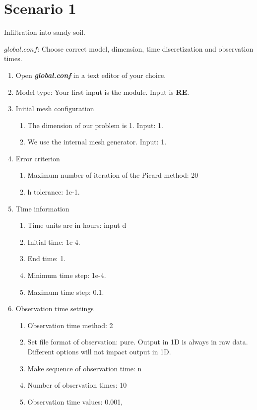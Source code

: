 \documentclass[
10pt, %
a4paper, %
oneside, %
headinclude,footinclude, %
BCOR5mm, %
]{scrartcl}
\begin{document}
\section*{Scenario 1}

Infiltration into sandy soil. 

$global.conf$: Choose correct model, dimension, time discretization and observation times.
\begin{enumerate}
\item Open \textbf{\emph{global.conf}} in a text editor of your choice. 
\item Model type: Your first input is the module. Input is \textbf{RE}.
\item Initial mesh configuration \begin{enumerate}
\item The dimension of our problem is 1. Input: 1.
\item We use the internal mesh generator. Input: 1. 
\end{enumerate}
\item Error criterion \begin{enumerate} 
\item Maximum number of iteration of the Picard method: 20 
\item h tolerance: 1e-1.
\end{enumerate}
\item Time information 
\begin{enumerate} 
\item Time units are in hours: input d
\item Initial time: 1e-4.
\item End time: 1.
\item Minimum time step: 1e-4.
\item Maximum time step: 0.1.
\end{enumerate}
\item Observation time settings \begin{enumerate}
\item Observation time method: 2
\item Set file format of observation: pure. Output in 1D is always in raw data. Different options will not impact output in 1D.
\item Make sequence of observation time: n
\item Number of observation times: 10
\item Observation time values: 0.001,

\end{enumerate}
\end{enumerate}
\end{document}
